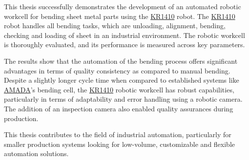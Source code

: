 This thesis successfully demonstrates the development of an automated robotic workcell for bending sheet metal parts using the \hyperref[acro:KR]{KR1410} robot. The \hyperref[acro:KR]{KR1410} robot handles all bending tasks, which are unloading, alignment, bending, checking and loading of sheet in an industrial environment. The robotic workcell is thoroughly evaluated, and its performance is measured across key parameters.

The results show that the automation of the bending process offers significant advantages in terms of quality consistency as compared to manual bending. Despite a slightly longer cycle time when compared to established systems like \hyperref[acro:AMADA]{AMADA}'s bending cell, the \hyperref[acro:KR]{KR1410} robotic workcell has robust capabilities, particularly in terms of adaptability and error handling using a robotic camera. The addition of an inspection camera also enabled quality assurances during production.

This thesis contributes to the field of industrial automation, particularly for smaller production systems looking for low-volume, customizable and flexible automation solutions.